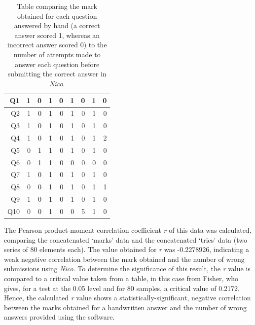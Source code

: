 \documentclass[12pt,twoside,notitlepage,xetex]{report}
\begin{document}
\begin{center}
\begin{table}[H]
\begin{center}
\begin{tabular}{|r||r|r||r|r||r|r||r|r|}
Q1 & 1 & 0 & 1 & 0 & 1 & 0 & 1 & 0\\ \hline
Q2 & 1 & 0 & 1 & 0 & 1 & 0 & 1 & 0\\ \hline
Q3 & 1 & 0 & 1 & 0 & 1 & 0 & 1 & 0\\ \hline
Q4 & 1 & 0 & 1 & 0 & 1 & 0 & 1 & 2\\ \hline
Q5 & 0 & 1 & 1 & 0 & 1 & 0 & 1 & 0\\ \hline
Q6 & 0 & 1 & 1 & 0 & 0 & 0 & 0 & 0\\ \hline
Q7 & 1 & 0 & 1 & 0 & 1 & 0 & 1 & 0\\ \hline
Q8 & 0 & 0 & 1 & 0 & 1 & 0 & 1 & 1\\ \hline
Q9 & 1 & 0 & 1 & 0 & 1 & 0 & 1 & 0\\ \hline
Q10 & 0 & 0 & 1 & 0 & 0 & 5 & 1 & 0\\
\hline
\end{tabular}
\end{center}
\caption{Table comparing the mark obtained for each question answered by hand (a correct answer scored 1, whereas an incorrect answer scored 0) to the number of attempts made to answer each question before submitting the correct answer in \emph{Nico}.}
\end{table}
\end{center}

The Pearson product-moment correlation coefficient \emph{r} of this data was calculated, comparing the concatenated `marks' data and the concatenated `tries' data (two series of 80 elements each).  The value obtained for \emph{r} was -0.2278926, indicating a weak negative correlation between the mark obtained and the number of wrong submissions using \emph{Nico}.  To determine the significance of this result, the \emph{r} value is compared to a critical value taken from a table, in this case from Fisher, who gives, for a test at the 0.05 level and for 80 samples, a critical value of 0.2172. \cite{Fisher1990}  Hence, the calculated \emph{r} value shows a statistically-significant, negative correlation between the marks obtained for a handwritten answer and the number of wrong answers provided using the software.
\end{document}

